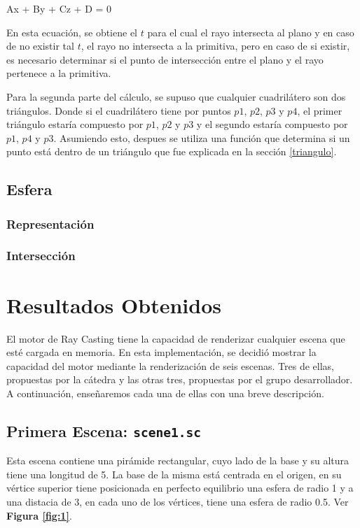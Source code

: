 \documentclass[a4paper,10pt]{article}
\begin{document}
 \begin{center}
 Ax + By + Cz + D = 0
\end{center}

En esta ecuaci\'on, se obtiene el $t$ para el cual el rayo intersecta al plano y en caso de no existir tal $t$, el rayo no intersecta a la primitiva, pero en caso de si existir, es necesario determinar si el punto de intersecci\'on entre el plano y el rayo pertenece a la primitiva.

Para la segunda parte del c\'alculo, se supuso que cualquier cuadril\'atero son dos tri\'angulos.  Donde si el cuadril\'atero tiene por puntos $p1$, $p2$, $p3$ y $p4$, el primer tri\'angulo estar\'ia compuesto por $p1$, $p2$ y $p3$ y el segundo estar\'ia compuesto por $p1$, $p4$ y $p3$.
Asumiendo esto, despues se utiliza una funci\'on que determina si un punto est\'a dentro de un tri\'angulo que fue explicada en la secci\'on \ref{triangulo}.

\subsection{Esfera}

\subsubsection{Representaci\'on}

\subsubsection{Intersecci\'on}

\section{Resultados Obtenidos}
\label{escenas}
El motor de Ray Casting tiene la capacidad de renderizar cualquier escena que est\'e cargada en memoria.  En esta implementaci\'on, se decidi\'o mostrar la capacidad del motor mediante la renderizaci\'on de seis escenas.  Tres de ellas, propuestas por la c\'atedra y las otras tres, propuestas por el grupo desarrollador.  A continuaci\'on, ense\~naremos cada una de ellas con una breve descripci\'on.

\subsection{Primera Escena: \texttt{scene1.sc}}
Esta escena contiene una pir\'amide rectangular, cuyo lado de la base y su altura tiene una longitud de 5.  La base de la misma est\'a centrada en el origen, en su v\'ertice superior tiene posicionada en perfecto equilibrio una esfera de radio 1 y a una distacia de 3, en cada uno de los v\'ertices, tiene una esfera de radio 0.5. Ver \textbf{Figura \ref{fig:1}}.
\end{document}
